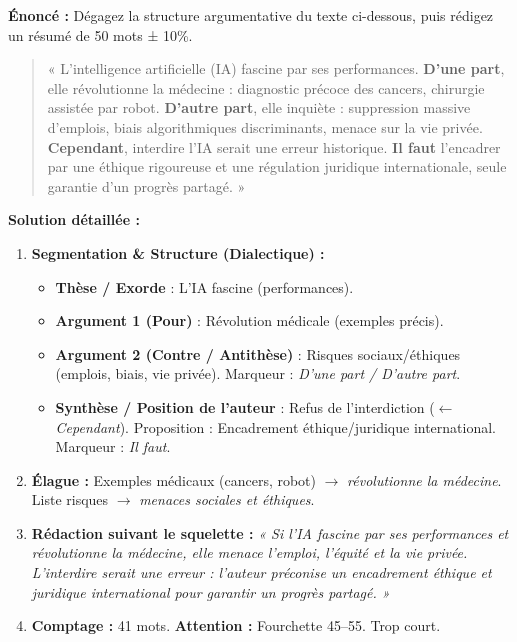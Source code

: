 \documentclass[11pt]{article}
\begin{document}
\begin{exoresolu}
\textbf{Énoncé :} Dégagez la structure argumentative du texte ci-dessous, puis rédigez un résumé de 50 mots ± 10\%.
\begin{quote}
« L'intelligence artificielle (IA) fascine par ses performances. \textbf{D'une part}, elle révolutionne la médecine : diagnostic précoce des cancers, chirurgie assistée par robot. \textbf{D'autre part}, elle inquiète : suppression massive d'emplois, biais algorithmiques discriminants, menace sur la vie privée. \textbf{Cependant}, interdire l'IA serait une erreur historique. \textbf{Il faut} l'encadrer par une éthique rigoureuse et une régulation juridique internationale, seule garantie d'un progrès partagé. »
\end{quote}
\tcblower
\textbf{Solution détaillée :}
\begin{enumerate}
    \item \textbf{Segmentation \& Structure (Dialectique) :}
    \begin{itemize}
        \item [\textcircled{1}] \textbf{Thèse / Exorde} : L'IA fascine (performances).
        \item [\textcircled{2}] \textbf{Argument 1 (Pour)} : Révolution médicale (exemples précis).
        \item [\textcircled{3}] \textbf{Argument 2 (Contre / Antithèse)} : Risques sociaux/éthiques (emplois, biais, vie privée). Marqueur : \emph{D'une part / D'autre part}.
        \item [\textcircled{4}] \textbf{Synthèse / Position de l'auteur} : Refus de l'interdiction ($\leftarrow$ \emph{Cependant}). Proposition : Encadrement éthique/juridique international. Marqueur : \emph{Il faut}.
    \end{itemize}
    \item \textbf{Élague :} Exemples médicaux (cancers, robot) $\rightarrow$ \emph{révolutionne la médecine}. Liste risques $\rightarrow$ \emph{menaces sociales et éthiques}.
    \item \textbf{Rédaction suivant le squelette :}
    \emph{« Si l'IA fascine par ses performances et révolutionne la médecine, elle menace l'emploi, l'équité et la vie privée. L'interdire serait une erreur : l'auteur préconise un encadrement éthique et juridique international pour garantir un progrès partagé. »}
    \item \textbf{Comptage :} 41 mots. \textbf{Attention :} Fourchette 45--55. Trop court.

\end{enumerate}
\end{exoresolu}
\end{document}
